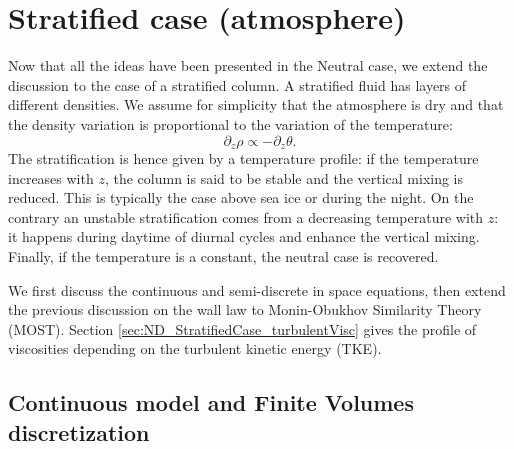 \section{Stratified case (atmosphere)}
Now that all the ideas have been presented in the Neutral case,
we extend the discussion to the case of a stratified column.
A stratified fluid has layers of different densities.
We assume for simplicity that the atmosphere
is dry and that the density variation is
proportional to the variation of the temperature:
\begin{equation}
	\partial_z \rho \propto
	- \partial_z \theta.
\end{equation}
The stratification is hence given by a temperature profile:
if the temperature increases with $z$, the column is said
to be stable and the vertical mixing is reduced. This is
typically the case above sea ice or during the night.
On the contrary an unstable stratification comes from
a decreasing temperature with $z$: it happens
during daytime of diurnal cycles and enhance the
vertical mixing.
%
Finally, if the temperature is a constant, the neutral case is
recovered.
\par
We first discuss the continuous and semi-discrete in space
equations, then extend the previous discussion on the wall law to
Monin-Obukhov Similarity Theory (MOST).
Section \ref{sec:ND_StratifiedCase_turbulentVisc} gives the
profile of viscosities depending on the turbulent kinetic energy
(TKE).
\subsection{Continuous model and Finite Volumes discretization}
